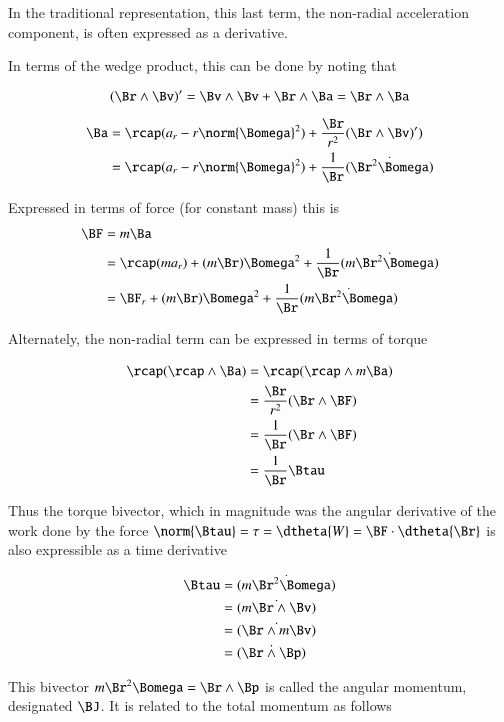 In the traditional representation, this last term, the non-radial acceleration
component, is often expressed as a derivative.

In terms of the wedge product, this can be done by noting that

\[
(\Br \wedge \Bv)' = \Bv \wedge \Bv + \Br \wedge \Ba = \Br \wedge \Ba
\]

\begin{align*}
\Ba 
   &= \rcap( a_r - r \norm{\Bomega}^2 ) + \frac{\Br}{r^2}(\Br \wedge \Bv)') \\
   &= \rcap( a_r - r \norm{\Bomega}^2 ) + \frac{1}{\Br}\dt{(\Br^2 \Bomega)} \\
\end{align*}

Expressed in terms of force (for constant mass) this is
\begin{align*}
\BF &= m \Ba \\
    &= \rcap (m a_r) + (m \Br) {\Bomega}^2
       + \frac{1}{\Br}\dt{(m \Br^2 \Bomega)} \\
    &= \BF_r + (m \Br) {\Bomega}^2
             + \frac{1}{\Br}\dt{(m \Br^2 \Bomega)} \\
\end{align*}

Alternately, the non-radial term can be expressed in terms of torque

\begin{align*}
\rcap (\rcap \wedge \Ba) 
   &= \rcap (\rcap \wedge m \Ba)  \\
   &= \frac{\Br}{r^2} (\Br \wedge \BF)  \\
   &= \frac{1}{\Br} (\Br \wedge \BF)  \\
   &= \frac{1}{\Br} \Btau \\
\end{align*}

Thus the torque bivector, which in magnitude was the angular derivative of
the work
done by the force $\norm{\Btau} = \tau = \dtheta{W} = \BF \cdot \dtheta{\Br}$
is also expressible as a time derivative

\begin{align*}
\Btau 
&= \dt{( m \Br^2 \Bomega )}  \\
&= \dt{( m \Br \wedge \Bv)}  \\
&= \dt{( \Br \wedge m \Bv)}  \\
&= \dt{( \Br \wedge \Bp  )}  \\
\end{align*}

This bivector $m \Br^2 \Bomega = \Br \wedge \Bp$ is called the angular
momentum, designated $\BJ$.  It is related to the total momentum as follows

